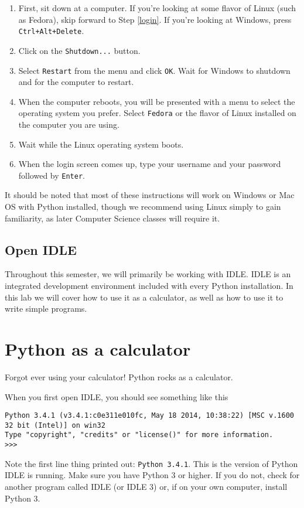 \documentclass[12pt]{article}
\begin{document}
\begin{enumerate}
\item First, sit down at a computer. If you're looking at some flavor of Linux (such as Fedora), skip forward to Step \ref{login}. If you're looking at Windows, press \texttt{Ctrl+Alt+Delete}.
\item Click on the \texttt{Shutdown...} button.
\item Select \texttt{Restart} from the menu and click \texttt{OK}. Wait for Windows to shutdown and for the computer to restart.
\item When the computer reboots, you will be presented with a menu to select the operating system you prefer. Select \texttt{Fedora} or the flavor of Linux installed on the computer you are using.
\item Wait while the Linux operating system boots.
\item \label{login} When the login screen comes up, type your username and your password followed by \texttt{Enter}.
\end{enumerate}

It should be noted that most of these instructions will work on Windows or Mac OS with Python installed, though we recommend using Linux simply to gain familiarity, as later Computer Science classes will require it.

\subsection{Open IDLE}
Throughout this semester, we will primarily be working with IDLE. IDLE is an integrated development environment included with every Python installation. In this lab we will cover how to use it as a calculator, as well as how to use it to write simple programs.

\section{Python as a calculator}
Forgot ever using your calculator! Python rocks as a calculator.

When you first open IDLE, you should see something like this
\begin{lstlisting}[style=bash]
Python 3.4.1 (v3.4.1:c0e311e010fc, May 18 2014, 10:38:22) [MSC v.1600 32 bit (Intel)] on win32
Type "copyright", "credits" or "license()" for more information.
>>> 
\end{lstlisting}

Note the first line thing printed out: \texttt{Python 3.4.1}. This is the version of Python IDLE is running. Make sure you have Python 3 or higher. If you do not, check for another program called IDLE (or IDLE 3) or, if on your own computer, install Python 3.
\end{document}
